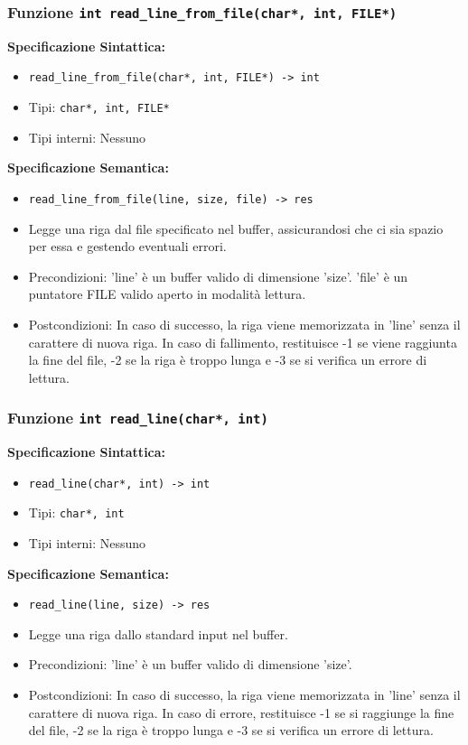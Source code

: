 \documentclass[11pt]{scrartcl} %
\begin{document}
\subsubsection{Funzione \texttt{int read\_line\_from\_file(char*, int, FILE*)}}

\textbf{Specificazione Sintattica:}
\begin{itemize}
	\item \texttt{read\_line\_from\_file(char*, int, FILE*) -> int}
	\item Tipi: \texttt{char*, int, FILE*}
	\item Tipi interni: Nessuno
\end{itemize}

\textbf{Specificazione Semantica:}
\begin{itemize}
	\item \texttt{read\_line\_from\_file(line, size, file) -> res}
	\item  Legge una riga dal file specificato nel buffer, assicurandosi che ci sia spazio per essa e  gestendo eventuali errori.
	\item Precondizioni: 'line' è un buffer valido di dimensione 'size'. 'file' è un puntatore FILE valido aperto in modalità lettura.
	\item Postcondizioni: In caso di successo, la riga viene memorizzata in 'line' senza il carattere di nuova riga. In caso di fallimento, restituisce -1 se viene raggiunta la fine del file, -2 se la riga è troppo lunga e -3 se si verifica un errore di lettura.
\end{itemize}

\subsubsection{Funzione \texttt{int read\_line(char*, int)}}

\textbf{Specificazione Sintattica:}
\begin{itemize}
	\item \texttt{read\_line(char*, int) -> int}
	\item Tipi: \texttt{char*, int}
	\item Tipi interni: Nessuno
\end{itemize}

\textbf{Specificazione Semantica:}
\begin{itemize}
	\item \texttt{read\_line(line, size) -> res}
	\item Legge una riga dallo standard input nel buffer.
	\item Precondizioni: 'line' è un buffer valido di dimensione 'size'.
	\item Postcondizioni: In caso di successo, la riga viene memorizzata in 'line' senza il carattere di nuova riga. In caso di errore, restituisce -1 se si raggiunge la fine del file, -2 se la riga è troppo lunga e -3 se si verifica un errore di lettura.
\end{itemize}
\end{document}
